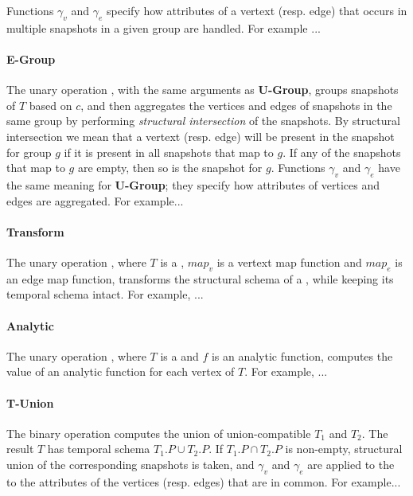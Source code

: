 Functions $\gamma_v$ and $\gamma_e$ specify how attributes of a
vertext (resp. edge) that occurs in multiple snapshots in a given
group are handled.  For example ...

\paragraph*{E-Group}  The unary operation , 
with the same arguments as {\bf U-Group}, groups snapshots of $T$
based on $c$, and then aggregates the vertices and edges of snapshots
in the same group by performing {\em structural intersection} of the
snapshots.  By structural intersection we mean that a vertext
(resp. edge) will be present in the snapshot for group $g$ if it is
present in all snapshots that map to $g$.  If any of the snapshots
that map to $g$ are empty, then so is the snapshot for $g$.  Functions
$\gamma_v$ and $\gamma_e$ have the same meaning for {\bf U-Group};
they specify how attributes of vertices and edges are aggregated.  For
example...

\paragraph*{Transform} The unary operation , where $T$ 
is a \tg, $map_v$ is a vertext map function and $map_e$ is an edge map
function, transforms the structural schema of a \tg, while keeping its
temporal schema intact.  For example, ...

\paragraph*{Analytic} The unary operation , where $T$ is a \tg and $f$ 
is an analytic function, computes the value of an analytic function
for each vertex of $T$.    For example, ...

\paragraph*{T-Union} The binary operation  
computes the union of union-compatible \tgs $T_1$ and $T_2$.  The
result $T$ has temporal schema $T_1.P \cup T_2.P$.  If $T_1.P \cap
T_2.P$ is non-empty, structural union of the corresponding snapshots
is taken, and $\gamma_v$ and $\gamma_e$ are applied to the to the
attributes of the vertices (resp. edges) that are in common.    For example...

